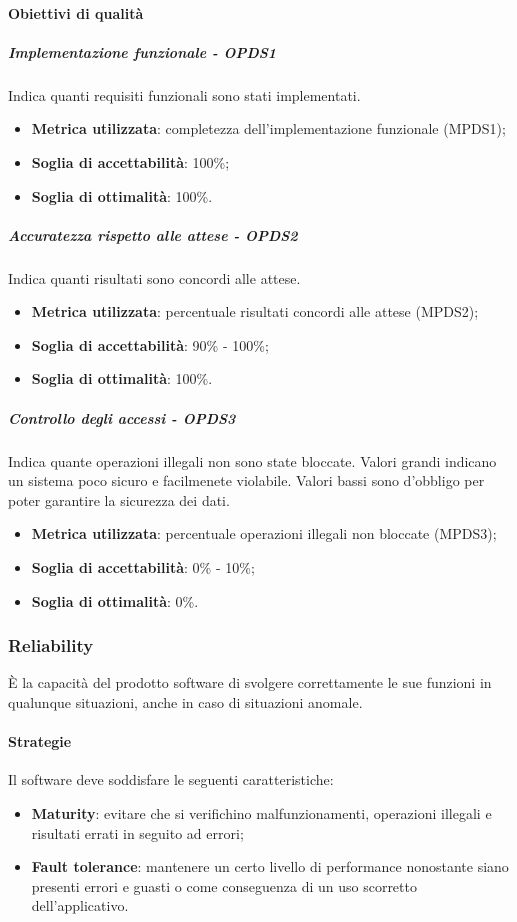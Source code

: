 \documentclass[PdQ.tex]{subfiles}
\begin{document}
			\paragraph{Obiettivi di qualità}
				\subparagraph{Implementazione funzionale - OPDS1}
				Indica quanti requisiti funzionali sono stati implementati.
				\begin{itemize}
					\item \textbf{Metrica utilizzata}: completezza dell'implementazione funzionale (MPDS1);
					\item \textbf{Soglia di accettabilità}: 100\%;
					\item \textbf{Soglia di ottimalità}: 100\%.
				\end{itemize}
				
				\subparagraph{Accuratezza rispetto alle attese - OPDS2}
				Indica quanti risultati sono concordi alle attese.
				\begin{itemize}
					\item \textbf{Metrica utilizzata}: percentuale risultati concordi alle attese (MPDS2);
					\item \textbf{Soglia di accettabilità}: 90\% - 100\%;
					\item \textbf{Soglia di ottimalità}: 100\%.
				\end{itemize}
				
				\subparagraph{Controllo degli accessi - OPDS3}
				Indica quante operazioni illegali non sono state bloccate. Valori grandi indicano un sistema poco sicuro e facilmenete violabile.
				Valori bassi sono d'obbligo per poter garantire la sicurezza dei dati.
				\begin{itemize}
					\item \textbf{Metrica utilizzata}: percentuale operazioni illegali non bloccate (MPDS3);
					\item \textbf{Soglia di accettabilità}: 0\% - 10\%;
					\item \textbf{Soglia di ottimalità}: 0\%.
				\end{itemize}
		
		\subsubsection{Reliability}
		È la capacità del prodotto software di svolgere correttamente le sue funzioni in qualunque situazioni, anche in caso di situazioni anomale.
		
			\paragraph{Strategie}
			Il software deve soddisfare le seguenti caratteristiche:
			\begin{itemize}
				\item \textbf{Maturity}: evitare che si verifichino malfunzionamenti, operazioni illegali e risultati errati in seguito ad errori;
				\item \textbf{Fault tolerance}: mantenere un certo livello di performance nonostante siano presenti errori e guasti o come conseguenza di un uso scorretto dell'applicativo.
			\end{itemize}
			
\end{document}
